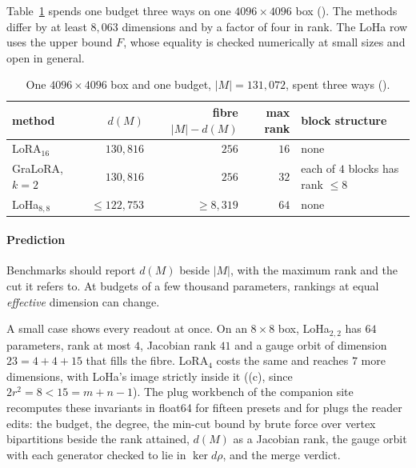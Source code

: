 Table~\ref{tab:onebudget} spends one budget three ways on one $4096\times4096$ box (). The
methods differ by at least $8{,}063$ dimensions and by a factor of four in rank. The LoHa row uses the upper bound $F$,
whose equality is checked numerically at small sizes and open in general.

\begin{table}[t]
  \centering
  \footnotesize
  \caption{One $4096\times4096$ box and one budget, $\lvert M\rvert=131{,}072$, spent three ways
    ().}
  \label{tab:onebudget}
  \renewcommand{\arraystretch}{1.12}
  \begin{tabularx}{\linewidth}{@{}lrrrX@{}}
    \toprule
    \headrow \textbf{method} & \textbf{$d(M)$} & \textbf{fibre $\lvert M\rvert-d(M)$} & \textbf{max rank} &
      \textbf{block structure}\\
    \midrule
    LoRA$_{16}$ & $130{,}816$ & $256$ & $16$ & none\\
    GraLoRA, $k=2$ & $130{,}816$ & $256$ & $32$ & each of $4$ blocks has rank $\le8$\\
    LoHa$_{8,8}$ & $\le122{,}753$ & $\ge8{,}319$ & $64$ & none\\
    \bottomrule
  \end{tabularx}
\end{table}

\paragraph{Prediction}
Benchmarks should report $d(M)$ beside $\lvert M\rvert$, with the maximum rank and the cut it refers to. At budgets of a
few thousand parameters, rankings at equal \emph{effective} dimension can change.

A small case shows every readout at once. On an $8\times8$ box, LoHa$_{2,2}$ has $64$ parameters, rank at most $4$,
Jacobian rank $41$ and a gauge orbit of dimension $23=4+4+15$ that fills the fibre. LoRA$_4$ costs the same and reaches
$7$ more dimensions, with LoHa's image strictly inside it ((c), since $2r^2=8<15=m+n-1$). The
plug workbench of the companion site recomputes these invariants in float64 for fifteen presets and for plugs the reader
edits: the budget, the degree, the min-cut bound by brute force over vertex bipartitions beside the rank attained, $d(M)$
as a Jacobian rank, the gauge orbit with each generator checked to lie in $\ker d\rho$, and the merge verdict.

